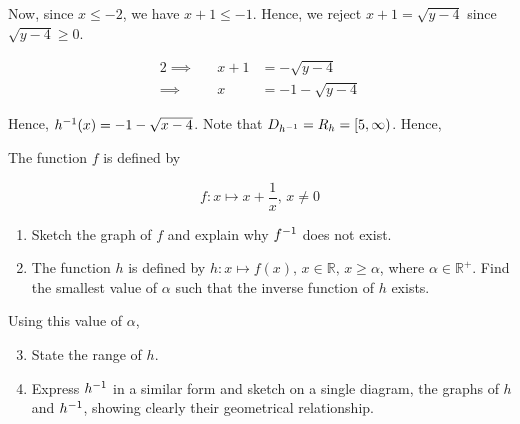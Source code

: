 \documentclass{echw}
\begin{document}
            Now, since $x \leq -2$, we have $x+1 \leq -1$. Hence, we reject $x + 1 = \sqrt{y-4}$ since $\sqrt{y-4} \geq 0$.

            \begin{alignat*}{2}
                \implies&&x + 1 &= -\sqrt{y-4}\\
                \implies&& x &= -1-\sqrt{y-4}
            \end{alignat*}

            Hence, $h^{-1}(x) = -1 -\sqrt{x-4}$. Note that $D_{h^{-1}} = R_{h} = [5, \infty)$. Hence,


    \problem{}
        The function $f$ is defined by

        \begin{equation*}
            f \colon x \mapsto x + \dfrac1{x}, \, x \neq 0
        \end{equation*}

        \begin{enumerate}
            \item Sketch the graph of $f$ and explain why $f^{-1}$ does not exist.
            \item The function $h$ is defined by $h \colon x \mapsto f(x), \, x \in \mathbb{R}, \, x \geq \alpha$, where $\alpha \in \mathbb{R}^+$. Find the smallest value of $\alpha$ such that the inverse function of $h$ exists.
        \end{enumerate}

        \noindent Using this value of $\alpha$,
        
        \begin{enumerate}
            \setcounter{enumi}{2}
            \item State the range of $h$.
            \item Express $h^{-1}$ in a similar form and sketch on a single diagram, the graphs of $h$ and $h^{-1}$, showing clearly their geometrical relationship.
        \end{enumerate}

    \solution
\end{document}

